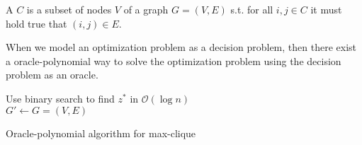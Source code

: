 \begin{definition}
    A  $C$ is a subset of nodes $V$ of a graph $G=(V,E)$ s.t.
    for all $i,j \in C$ it must hold true that $(i,j)\in E$.
\end{definition}
\begin{theorem}
    When we model an optimization problem as a decision problem, then there exist
    a oracle-polynomial way to solve the optimization problem using the decision problem
    as an oracle. \label{th:opt-dec-problem}
\end{theorem}
\begin{algorithm}[H]
    \SetAlgoLined
    Use binary search to find $z^*$ in $\mathcal{O}(\log n)$\\
    $G' \leftarrow G = (V,E)$\\
    \caption{Oracle-polynomial algorithm for max-clique}
\end{algorithm} \noindent

